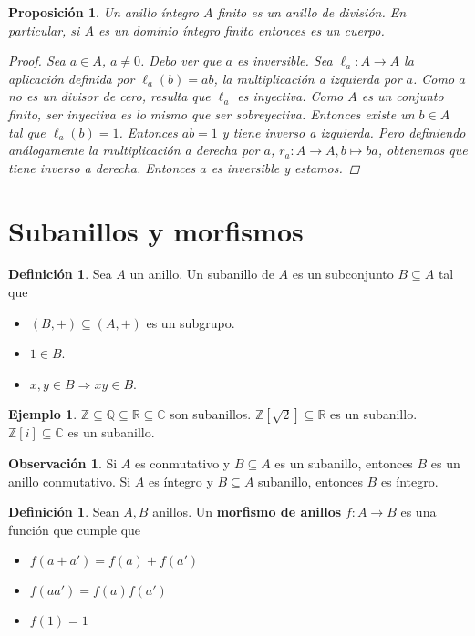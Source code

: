 \documentclass[12pt]{book}
\newtheorem{prop}[teo]{Proposición}
\theoremstyle{definition}
\newtheorem{obs}[teo]{Observación}
\newtheorem{defn}[teo]{Definición}
\newtheorem{ex}[teo]{Ejemplo}
\newcommand{\CC}{\mathbb{C}}
\newcommand{\RR}{\mathbb{R}}      %
\newcommand{\ZZ}{\mathbb{Z}}      %
\newcommand{\QQ}{\mathbb{Q}}
\begin{document}
\begin{prop}
Un anillo íntegro $A$ finito es un anillo de división. En particular, si $A$ es un dominio íntegro finito entonces es un cuerpo.
\begin{proof}
Sea $a\in A$, $a\neq 0$. Debo ver que $a$ es inversible. Sea $\ell_a : A \to A$ la aplicación definida por $\ell_a(b)=ab$, la multiplicación a izquierda por $a$. Como $a$ no es un divisor de cero, resulta que $\ell_a$ es inyectiva. Como $A$ es un conjunto finito, ser inyectiva es lo mismo que ser sobreyectiva. Entonces existe un $b\in A$ tal que $\ell_a(b)=1$. Entonces $ab=1$ y tiene inverso a izquierda. Pero definiendo análogamente la multiplicación a derecha por $a$, $r_a:A\to A, b\mapsto ba$, obtenemos que tiene inverso a derecha. Entonces $a$ es inversible y estamos.
\end{proof}
\end{prop}

\section{Subanillos y morfismos}

\begin{defn}
Sea $A$ un anillo. Un subanillo de $A$ es un subconjunto $B\subseteq A$ tal que \begin{itemize} \item $(B,+)\subseteq (A,+)$ es un subgrupo. \item $1\in B$. \item $x,y\in B \Longrightarrow xy\in B$. \end{itemize}
\end{defn}

\begin{ex}
$\ZZ\subseteq \QQ \subseteq \RR\subseteq \CC$ son subanillos. $\ZZ [\sqrt{2}]\subseteq \RR$ es un subanillo. $\ZZ[i]\subseteq \CC$ es un subanillo.
\end{ex}

\begin{obs}
Si $A$ es conmutativo y $B\subseteq A$ es un subanillo, entonces $B$ es un anillo conmutativo. Si $A$ es íntegro y $B\subseteq A$ subanillo, entonces $B$ es íntegro.
\end{obs}

\begin{defn}
Sean $A,B$ anillos. Un \textbf{morfismo de anillos} $f:A\to B$ es una función que cumple que \begin{itemize}\item $f(a+a')=f(a)+f(a')$ \item $f(aa') = f(a)f(a')$ \item $f(1)=1$ \end{itemize}
\end{defn}
\end{document}
